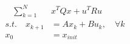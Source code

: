 \documentclass[preview]{standalone}
\begin{document}
\begin{align*}
\quad \sum_{k=1}^N \; &x^TQx + u^T R u \\ s.t. \quad x_{k+1} &= Ax_k + Bu_k, \quad \forall k \\ x_0 &= x_{init}
\end{align*}
\end{document}
